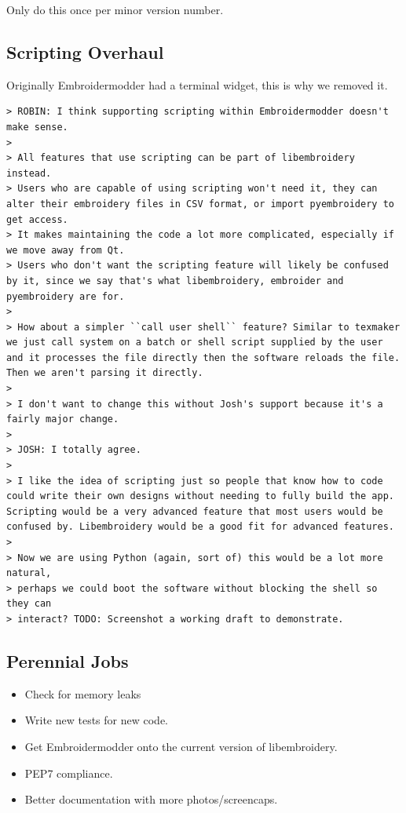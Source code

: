\documentclass[11pt]{report}
\begin{document}
Only do this once per minor version number.

\subsection{Scripting Overhaul}

Originally Embroidermodder had a terminal widget, this is why we removed it.

\begin{verbatim}
> ROBIN: I think supporting scripting within Embroidermodder doesn't make sense.
> 
> All features that use scripting can be part of libembroidery instead.
> Users who are capable of using scripting won't need it, they can alter their embroidery files in CSV format, or import pyembroidery to get access.
> It makes maintaining the code a lot more complicated, especially if we move away from Qt.
> Users who don't want the scripting feature will likely be confused by it, since we say that's what libembroidery, embroider and pyembroidery are for.
> 
> How about a simpler ``call user shell`` feature? Similar to texmaker we just call system on a batch or shell script supplied by the user and it processes the file directly then the software reloads the file. Then we aren't parsing it directly.
> 
> I don't want to change this without Josh's support because it's a fairly major change.
>
> JOSH: I totally agree.
> 
> I like the idea of scripting just so people that know how to code could write their own designs without needing to fully build the app. Scripting would be a very advanced feature that most users would be confused by. Libembroidery would be a good fit for advanced features.
> 
> Now we are using Python (again, sort of) this would be a lot more natural,
> perhaps we could boot the software without blocking the shell so they can
> interact? TODO: Screenshot a working draft to demonstrate.
\end{verbatim}

\subsection{Perennial Jobs}

\begin{itemize}
\item Check for memory leaks
\item Write new tests for new code.
\item Get Embroidermodder onto the current version of libembroidery.
\item PEP7 compliance.
\item Better documentation with more photos/screencaps.
\end{itemize}
\end{document}
